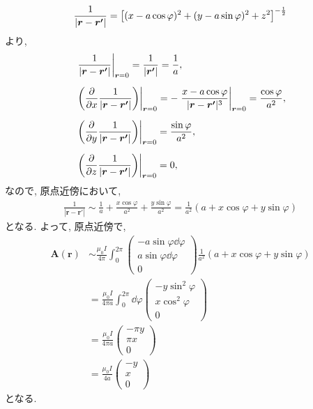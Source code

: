 \documentclass[../../ou-physics-exam.tex]{subfiles}
\begin{document}
\begin{answer}
    \begin{align*}
        \frac{1}{| \bm{r} - \bm{r'} |} = \qty[ (x - a \cos \varphi)^2 + (y - a \sin \varphi)^2 + z^2 ]^{- \frac{1}{2}}
    \end{align*}
    より,
    \begin{align*}
        & \left. \frac{1}{| \bm{r} - \bm{r'} |} \right|_{\bm{r} = 0} = \frac{1}{|\bm{r'}|} = \frac{1}{a}, \\[2mm]
        & \left. \qty(\pdv{x} \frac{1}{| \bm{r} - \bm{r'} |}) \right|_{\bm{r} = 0} = - \left. \frac{x - a \cos \varphi }{ | \bm{r} - \bm{r'} |^{3}} \right|_{\bm{r} = 0} = \frac{ \cos \varphi}{a^2}, \\[2mm]
        & \left. \qty(\pdv{y} \frac{1}{| \bm{r} - \bm{r'} |}) \right|_{\bm{r} = 0} = \frac{ \sin \varphi}{a^2}, \\[2mm]
        & \left. \qty(\pdv{z} \frac{1}{| \bm{r} - \bm{r'} |}) \right|_{\bm{r} = 0} = 0,
    \end{align*}
    なので, 原点近傍において,
    \begin{align*}
        \frac{1}{| \bm{r} - \bm{r'} |} \sim \frac{1}{a} + \frac{x \cos \varphi}{a^2} + \frac{y \sin \varphi}{a^2} = \frac{1}{a^2} (a + x \cos \varphi + y \sin \varphi)
    \end{align*}
    となる. 
    よって, 原点近傍で,
    \begin{align*}
        \bm{A} (\bm{r}) 
        & \sim \frac{\mu_0 I}{4 \pi} \int_0^{2 \pi} 
        \begin{pmatrix}
            -a \sin \varphi \dd{\varphi} \\
            a \sin \varphi \dd{\varphi} \\
            0
        \end{pmatrix}
        \frac{1}{a^2} (a + x \cos \varphi + y \sin \varphi) \\[2mm]
        & = \frac{\mu_0 I}{4 \pi a} \int_0^{2 \pi } \dd{\varphi} 
        \begin{pmatrix}
            -y \sin^2 \varphi \\
            x \cos^2 \varphi \\
            0
        \end{pmatrix} \\[2mm]
        & = \frac{\mu_0 I}{4 \pi a} 
        \begin{pmatrix}
            - \pi y \\
            \pi x \\
            0
        \end{pmatrix} \\[2mm]
        & = \frac{\mu_0 I}{4a} 
        \begin{pmatrix}
            -y \\ x \\ 0
        \end{pmatrix}
    \end{align*}
    となる.
\end{answer}
\end{document}
